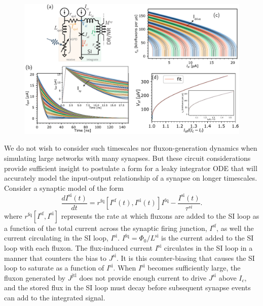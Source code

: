 \documentclass[twocolumn]{article}
\begin{document}
\begin{figure}[htb]
\includegraphics[width=17.2cm]{figures/_03__syn__1jj__circuit__rate_array.pdf}
\end{figure}
We do not wish to consider such timescales nor fluxon-generation dynamics when simulating large networks with many synapses. But these circuit considerations provide sufficient insight to postulate a form for a leaky integrator ODE that will accurately model the input-output relationship of a synapse on longer timescales. Consider a synaptic model of the form 
\begin{equation}
\label{eq:leaky_integrator__SI_loop}
\frac{dI^{\mathrm{si}}(t)}{dt} = r^{\mathrm{fq}}\left[I^{\mathrm{sf}}(t),I^{\mathrm{si}}(t)\right] I^{\mathrm{fq}}-\frac{I^{\mathrm{si}}(t)}{\tau^{si}}.
\end{equation}
where $r^{\mathrm{fq}}\left[I^{\mathrm{sf}},I^{\mathrm{si}}\right]$ represents the rate at which fluxons are added to the SI loop as a function of the total current across the synaptic firing junction, $I^{\mathrm{sf}}$, as well the current circulating in the SI loop, $I^{\mathrm{si}}$. $I^{\mathrm{fq}} = \Phi_0/L^{\mathrm{si}}$ is the current added to the SI loop with each fluxon. The flux-induced current $I^{\mathrm{si}}$ circulates in the SI loop in a manner that counters the bias to $J^{\mathrm{si}}$. It is this counter-biasing that causes the SI loop to saturate as a function of $I^{\mathrm{si}}$. When $I^{\mathrm{si}}$ becomes sufficiently large, the fluxon generated by $J^{\mathrm{jtl}}$ does not provide enough current to drive $J^{\mathrm{si}}$ above $I_c$, and the stored flux in the SI loop must decay before subsequent synapse events can add to the integrated signal.
\end{document}
